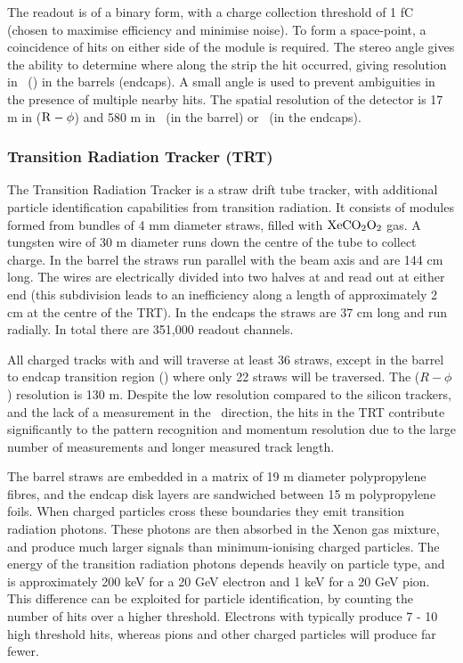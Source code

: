  The readout is of a binary form, with a charge collection threshold of 1
fC (chosen to maximise efficiency and minimise noise). To form a space-point, a
coincidence of hits on either side of the module is required. The stereo
angle gives the ability to determine where along the strip the hit occurred,
giving resolution in \z\ (\R) in the barrels (endcaps). A small angle is used to
prevent ambiguities in the presence of multiple nearby hits. The spatial
resolution of the detector is 17 \micro m in ($\rm{R}-\phi$) and 580 \micro m in
\z\ (in the barrel) or \R\ (in the endcaps).

\subsubsection{Transition Radiation Tracker (TRT)}
\label{sec:Detector-TRT}

The Transition Radiation Tracker is a straw drift tube tracker, with additional
particle identification capabilities from transition radiation. It consists of
modules formed from bundles of 4 mm diameter straws, filled with
$\rm{XeCO_{2}O_{2}}$ gas. A tungsten wire of 30 \micro m diameter runs down
the centre of the tube to collect charge. In the barrel the straws run parallel
with the beam axis and are 144 cm long. The wires are electrically divided into two halves at
 and read out at either end (this subdivision leads to an
inefficiency along a length of approximately 2 cm at the centre of the TRT). In
the endcaps the straws are 37 cm long and run radially. In total there are
351,000 readout channels.

All charged tracks with  and  will traverse at least 36
straws, except in the barrel to endcap transition region ()
where only 22 straws will be traversed. The ($R-\phi$) resolution is 130 \micro
m. Despite the low resolution compared to the silicon trackers, and the lack of
a measurement in the \z\ direction, the hits in the TRT contribute significantly
to the pattern recognition and momentum resolution due to the large number of
measurements and longer measured track length.

The barrel straws are embedded in a matrix of 19 \micro m diameter polypropylene
fibres, and the endcap disk layers are sandwiched between 15 \micro m
polypropylene foils. When charged particles cross these boundaries they emit
transition radiation photons. These photons are then absorbed in the Xenon gas
mixture, and produce much larger signals than minimum-ionising
charged particles. The energy of the transition radiation photons depends
heavily on particle type, and is approximately 200 keV for a 20 GeV electron and
1 keV for a 20 GeV pion. This difference can be exploited for particle
identification, by counting the number of hits over a higher threshold.
Electrons with  typically produce 7 - 10 high threshold hits, whereas
pions and other charged particles will produce far fewer.

